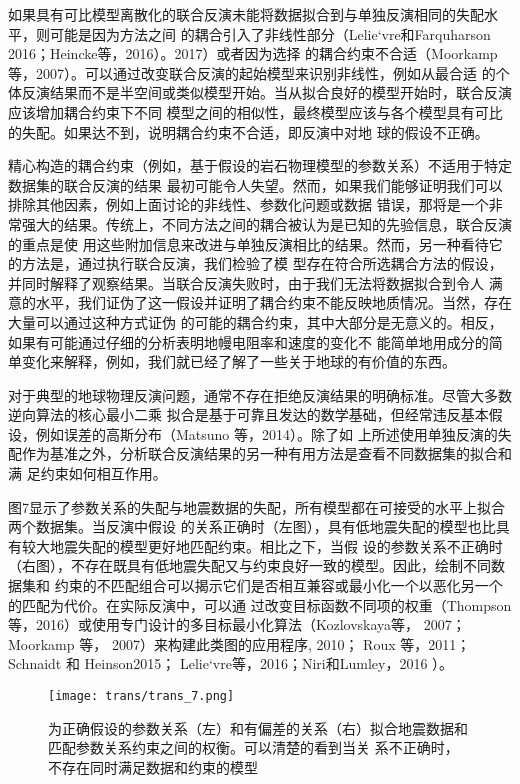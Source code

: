 如果具有可比模型离散化的联合反演未能将数据拟合到与单独反演相同的失配水平，则可能是因为方法之间 的耦合引入了非线性部分（Lelie`vre和Farquharson 2016；Heincke等，2016）。2017）或者因为选择 的耦合约束不合适（Moorkamp等，2007）。可以通过改变联合反演的起始模型来识别非线性，例如从最合适 的个体反演结果而不是半空间或类似模型开始。当从拟合良好的模型开始时，联合反演应该增加耦合约束下不同 模型之间的相似性，最终模型应该与各个模型具有可比的失配。如果达不到，说明耦合约束不合适，即反演中对地 球的假设不正确。

精心构造的耦合约束（例如，基于假设的岩石物理模型的参数关系）不适用于特定数据集的联合反演的结果 最初可能令人失望。然而，如果我们能够证明我们可以排除其他因素，例如上面讨论的非线性、参数化问题或数据 错误，那将是一个非常强大的结果。传统上，不同方法之间的耦合被认为是已知的先验信息，联合反演的重点是使 用这些附加信息来改进与单独反演相比的结果。然而，另一种看待它的方法是，通过执行联合反演，我们检验了模 型存在符合所选耦合方法的假设，并同时解释了观察结果。当联合反演失败时，由于我们无法将数据拟合到令人 满意的水平，我们证伪了这一假设并证明了耦合约束不能反映地质情况。当然，存在大量可以通过这种方式证伪 的可能的耦合约束，其中大部分是无意义的。相反，如果有可能通过仔细的分析表明地幔电阻率和速度的变化不 能简单地用成分的简单变化来解释，例如，我们就已经了解了一些关于地球的有价值的东西。

对于典型的地球物理反演问题，通常不存在拒绝反演结果的明确标准。尽管大多数逆向算法的核心最小二乘 拟合是基于可靠且发达的数学基础，但经常违反基本假设，例如误差的高斯分布（Matsuno 等，2014）。除了如 上所述使用单独反演的失配作为基准之外，分析联合反演结果的另一种有用方法是查看不同数据集的拟合和满 足约束如何相互作用。

图7显示了参数关系的失配与地震数据的失配，所有模型都在可接受的水平上拟合两个数据集。当反演中假设 的关系正确时（左图），具有低地震失配的模型也比具有较大地震失配的模型更好地匹配约束。相比之下，当假 设的参数关系不正确时（右图），不存在既具有低地震失配又与约束良好一致的模型。因此，绘制不同数据集和 约束的不匹配组合可以揭示它们是否相互兼容或最小化一个以恶化另一个的匹配为代价。在实际反演中，可以通 过改变目标函数不同项的权重（Thompson 等，2016）或使用专门设计的多目标最小化算法（Kozlovskaya等， 2007；Moorkamp 等， 2007）来构建此类图的应用程序, 2010； Roux 等，2011； Schnaidt 和 Heinson2015； Lelie`vre等，2016；Niri和Lumley，2016 ）。

\begin{figure}[H]
    \centering
    \texttt{[image: trans/trans\_7.png]}
    \setcounter{figure}{6}
    \caption{为正确假设的参数关系（左）和有偏差的关系（右）拟合地震数据和匹配参数关系约束之间的权衡。可以清楚的看到当关 系不正确时，不存在同时满足数据和约束的模型} \label{trans7}

\end{figure}

